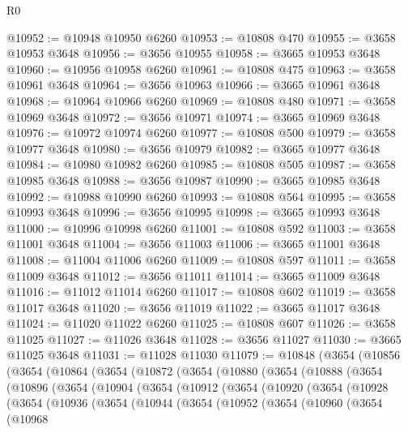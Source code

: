 \begin{lexlean}{R0}
\begin{coremodule}
@10952 := @10948 @10950 @6260
@10953 := @10808 @470
@10955 := @3658 @10953 @3648
@10956 := @3656 @10955
@10958 := @3665 @10953 @3648
@10960 := @10956 @10958 @6260
@10961 := @10808 @475
@10963 := @3658 @10961 @3648
@10964 := @3656 @10963
@10966 := @3665 @10961 @3648
@10968 := @10964 @10966 @6260
@10969 := @10808 @480
@10971 := @3658 @10969 @3648
@10972 := @3656 @10971
@10974 := @3665 @10969 @3648
@10976 := @10972 @10974 @6260
@10977 := @10808 @500
@10979 := @3658 @10977 @3648
@10980 := @3656 @10979
@10982 := @3665 @10977 @3648
@10984 := @10980 @10982 @6260
@10985 := @10808 @505
@10987 := @3658 @10985 @3648
@10988 := @3656 @10987
@10990 := @3665 @10985 @3648
@10992 := @10988 @10990 @6260
@10993 := @10808 @564
@10995 := @3658 @10993 @3648
@10996 := @3656 @10995
@10998 := @3665 @10993 @3648
@11000 := @10996 @10998 @6260
@11001 := @10808 @592
@11003 := @3658 @11001 @3648
@11004 := @3656 @11003
@11006 := @3665 @11001 @3648
@11008 := @11004 @11006 @6260
@11009 := @10808 @597
@11011 := @3658 @11009 @3648
@11012 := @3656 @11011
@11014 := @3665 @11009 @3648
@11016 := @11012 @11014 @6260
@11017 := @10808 @602
@11019 := @3658 @11017 @3648
@11020 := @3656 @11019
@11022 := @3665 @11017 @3648
@11024 := @11020 @11022 @6260
@11025 := @10808 @607
@11026 := @3658 @11025
@11027 := @11026 @3648
@11028 := @3656 @11027
@11030 := @3665 @11025 @3648
@11031 := @11028 @11030
@11079 := @10848
    (@3654
      (@10856
        (@3654
          (@10864
            (@3654
              (@10872
                (@3654
                  (@10880
                    (@3654
                      (@10888
                        (@3654
                          (@10896
                            (@3654
                              (@10904
                                (@3654
                                  (@10912
                                    (@3654
                                      (@10920
                                        (@3654
                                          (@10928
                                            (@3654
                                              (@10936
                                                (@3654
                                                  (@10944
                                                    (@3654
                                                      (@10952
                                                        (@3654
                                                          (@10960
                                                            (@3654
                                                              (@10968

\end{coremodule}
\end{lexlean}
